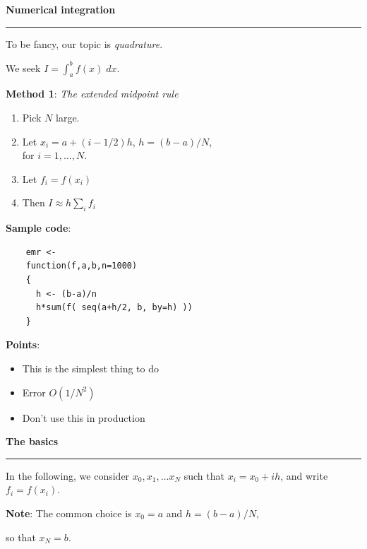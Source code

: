 \documentclass[12pt,letterpaper]{article}
\newcommand{\HRule}{\rule{\linewidth}{4pt}}
\newcommand{\hspone}{\hspace*{1cm}}
\newcommand{\vsphalf}{\vspace*{0.5cm}}
\begin{document}
\fontsize{30}{30} \selectfont

\centerline{\textbf{Numerical integration}}

\HRule

\vsphalf

\fontsize{20}{25} \selectfont

To be fancy, our topic is \emph{quadrature}.

\bigskip

We seek $I = \int_a^b f(x) \; dx$.

\bigskip \bigskip

\textbf{Method 1}: \emph{The extended midpoint rule}
\begin{enumerate}
\item Pick $N$ large.
\item Let $x_i = a + (i - 1/2)h$, $h = (b-a)/N$, \\
   for $i = 1, \ldots, N$.
\item Let $f_i = f(x_i)$
\item Then $I \approx h \sum_i f_i$
\end{enumerate}

\bigskip

\textbf{Sample code}:
\begin{verbatim}
    emr <-
    function(f,a,b,n=1000)
    {
      h <- (b-a)/n
      h*sum(f( seq(a+h/2, b, by=h) ))
    }
\end{verbatim}

\textbf{Points}:
\begin{itemize}
\item This is the simplest thing to do
\item Error $O(1/N^2)$
\item Don't use this in production
\end{itemize}


\newpage

\fontsize{30}{30} \selectfont

\centerline{\textbf{The basics}}

\HRule

\vsphalf

\fontsize{20}{25} \selectfont

In the following, we consider $x_0, x_1, \ldots x_N$ such that
$x_i = x_0 + i h$, and write $f_i = f(x_i)$.

\bigskip

\textbf{Note}: The common choice is $x_0 = a$ and $h = (b-a)/N$,

\hspone so that $x_N = b$.
\end{document}
